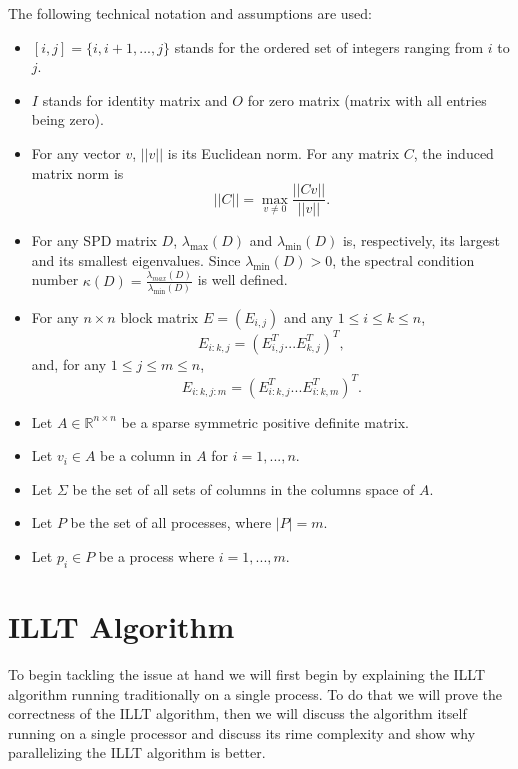\documentclass[11pt]{article}
\theoremstyle{definition}
\begin{document}
The following technical notation and assumptions are used:
\begin{itemize}
\item $[i,j]=\{i,i+1,...,j\}$ stands for the ordered set of integers ranging from $i$ to $j$.
\item $I$ stands for identity matrix and $O$ for zero matrix (matrix with all entries being zero).
\item For any vector $v$, $||v||$ is its Euclidean norm. For any matrix $C$, the induced matrix norm is
\begin{equation*}
||C||=\max_{v\neq 0}\frac{||Cv||}{||v||}.
\end{equation*}
\item For any SPD matrix $D$, $\lambda_{\max}(D)$ and $\lambda_{\min}(D)$ is, respectively, its largest and its smallest eigenvalues. Since $\lambda_{\min}(D)>0$, the spectral condition number $\kappa(D)=\frac{\lambda_{max}(D)}{\lambda_{\min}(D)}$ is well defined.
\item For any $n\times n$ block matrix $E=(E_{i,j})$ and any $1\leq i\leq k\leq n$,
\begin{equation*}
E_{i:k,j}=(E^T_{i,j}...E^T_{k,j})^T,
\end{equation*}
and, for any $1\leq j\leq m\leq n$,
\begin{equation*}
E_{i:k,j:m}=(E^T_{i:k,j}...E^T_{i:k,m})^T.
\end{equation*}
\item Let $A\in\mathbb{R}^{n\times n}$ be a sparse symmetric positive definite matrix.
\item Let $v_i\in A$ be a column in $A$ for $i=1,...,n$.
\item Let $\Sigma$ be the set of all sets of columns in the columns space of $A$.
\item Let $P$ be the set of all processes, where $|P|=m$.
\item Let $p_i\in P$ be a process where $i=1,...,m$.
\end{itemize}

\section{ILLT Algorithm}
To begin tackling the issue at hand we will first begin by explaining the ILLT algorithm running traditionally on a single process. To do that we will prove the correctness of the ILLT algorithm, then we will discuss the algorithm itself running on a single processor and discuss its rime complexity and show why parallelizing the ILLT algorithm is better.
\end{document}
